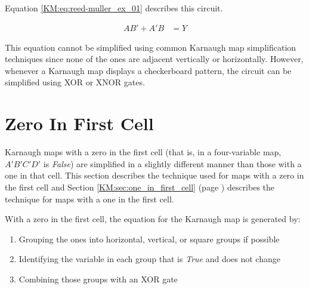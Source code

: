 \begin{figure}[H]
\end{figure}

Equation \ref{KM:eq:reed-muller_ex_01} describes this circuit.

\begin{align}
  \label{KM:eq:reed-muller_ex_01}
  AB'+A'B &= Y 
\end{align}

This equation cannot be simplified using common Karnaugh map simplification techniques since none of the ones are adjacent vertically or horizontally. However, whenever a Karnaugh map displays a checkerboard pattern, the circuit can be simplified using \textsf{XOR} or \textsf{XNOR} gates. 

\section{Zero In First Cell}
\label{KM:sec:zero_in_first_cell}

Karnaugh maps with a zero in the first cell (that is, in a four-variable map, $ A'B'C'D' $ is \emph{False}) are simplified in a slightly different manner than those with a one in that cell. This section describes the technique used for maps with a zero in the first cell and Section \ref{KM:sec:one_in_first_cell} (page \pageref{KM:sec:one_in_first_cell}) describes the technique for maps with a one in the first cell. 

With a zero in the first cell, the equation for the Karnaugh map is generated by:

\begin{enumerate}
  \item Grouping the ones into horizontal, vertical, or square groups if possible 
  \item Identifying the variable in each group that is \emph{True} and does not change 
  \item Combining those groups with an \textsf{XOR} gate 
\end{enumerate}

